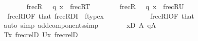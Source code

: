 \begin{isabellebody}
\ \ \ \ \ \ \isamarkupfalse%
\ {\isachardoublequoteopen}frecR{\isacharparenleft}{\kern0pt}{\isasymlangle}{}{\isacharcomma}{\kern0pt}\ {\isasymsigma}{\isacharcomma}{\kern0pt}\ {\isacharquery}{\kern0pt}{\isasymtau}{\isacharcomma}{\kern0pt}\ q{\isasymrangle}{\isacharcomma}{\kern0pt}\ x{\isacharparenright}{\kern0pt}{\isachardoublequoteclose}\ {\isacharparenleft}{\kern0pt}\ {\isachardoublequoteopen}frecR{\isacharparenleft}{\kern0pt}{\isacharquery}{\kern0pt}T{\isacharcomma}{\kern0pt}{\isacharunderscore}{\kern0pt}{\isacharparenright}{\kern0pt}{\isachardoublequoteclose}{\isacharparenright}{\kern0pt}\isanewline
\ \ \ \ \ \ \ \ {\isachardoublequoteopen}frecR{\isacharparenleft}{\kern0pt}{\isasymlangle}{}{\isacharcomma}{\kern0pt}\ {\isasymsigma}{\isacharcomma}{\kern0pt}\ {\isacharquery}{\kern0pt}{\isasymtheta}{\isacharcomma}{\kern0pt}\ q{\isasymrangle}{\isacharcomma}{\kern0pt}\ x{\isacharparenright}{\kern0pt}{\isachardoublequoteclose}\ {\isacharparenleft}{\kern0pt}\ {\isachardoublequoteopen}frecR{\isacharparenleft}{\kern0pt}{\isacharquery}{\kern0pt}U{\isacharcomma}{\kern0pt}{\isacharunderscore}{\kern0pt}{\isacharparenright}{\kern0pt}{\isachardoublequoteclose}{\isacharparenright}{\kern0pt}\isanewline
\ \ \ \ \ \ \ \ \isamarkupfalse%
\ \ frecRI{}{\isacharprime}{\kern0pt}{\isacharbrackleft}{\kern0pt}OF\ that{\isacharparenleft}{\kern0pt}{}{\isacharparenright}{\kern0pt}{\isacharbrackright}{\kern0pt}\ frecR{\isacharunderscore}{\kern0pt}DI\ \ {\isacartoucheopen}ftype{\isacharparenleft}{\kern0pt}x{\isacharparenright}{\kern0pt}\ {\isacharequal}{\kern0pt}\ {}{\isacartoucheclose}\ \isanewline
\ \ \ \ \ \ \ \ \ \ frecRI{}{\isacharprime}{\kern0pt}{\isacharbrackleft}{\kern0pt}OF\ that{\isacharparenleft}{\kern0pt}{}{\isacharparenright}{\kern0pt}{\isacharbrackright}{\kern0pt}\ \isanewline
\ \ \ \ \ \ \ \ \isamarkupfalse%
\ {\isacharparenleft}{\kern0pt}auto\ simp\ add{\isacharcolon}{\kern0pt}components{\isacharunderscore}{\kern0pt}simp{\isacharparenright}{\kern0pt}\isanewline
\ \ \ \ \ \ \isamarkupfalse%
\ {\isacartoucheopen}x{\isasymin}{\isacharquery}{\kern0pt}D{\isacartoucheclose}\ {\isacartoucheopen}{\isasymsigma}{\isasymin}A{}{\isacartoucheclose}\ {\isacartoucheopen}q{\isasymin}A{}{\isacartoucheclose}\isanewline
\ \ \ \ \ \ \isamarkupfalse%
\ {\isachardoublequoteopen}{\isasymlangle}{\isacharquery}{\kern0pt}T{\isacharcomma}{\kern0pt}x{\isasymrangle}{\isasymin}\ frecrel{\isacharparenleft}{\kern0pt}{\isacharquery}{\kern0pt}D{\isacharparenright}{\kern0pt}{\isachardoublequoteclose}\ {\isachardoublequoteopen}{\isasymlangle}{\isacharquery}{\kern0pt}U{\isacharcomma}{\kern0pt}x{\isasymrangle}{\isasymin}\ frecrel{\isacharparenleft}{\kern0pt}{\isacharquery}{\kern0pt}D{\isacharparenright}{\kern0pt}{\isachardoublequoteclose}\ \isanewline

\end{isabellebody}
